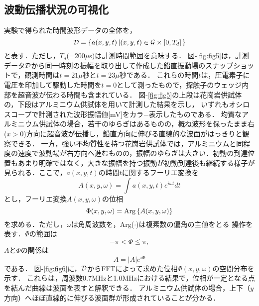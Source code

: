 ﻿%
\subsection{波動伝播状況の可視化}
実験で得られた時間波形データの全体を，
\begin{equation}
	{\cal D}=\left\{
		a(x,y,t)\left| (x,y,t)\in {\cal G}\times [0,T_d] \right.
	\right\}
	\label{eqn:dataset}
\end{equation}
と表す．ただし，$T_d$(=200$\mu$s)は計測時間範囲を意味する．
図-\ref{fig:fig5}は，計測データ$\cal D$から同一時刻の振幅を取り出して作成した鉛直振動場のスナップショットで，観測時間は$t=21\mu$秒と$t=23\mu$秒である．
これらの時間$t$は，圧電素子に電圧を印加して駆動した時間を$t=0$として測ったもので，探触子のウェッジ内部を超音波が伝わる時間も含まれている．
図-\ref{fig:fig5}の上段は花崗岩供試体の，下段はアルミニウム供試体を用いて計測した結果を示し，
いずれもオシロスコープで計測された波形振幅値[mV]をカラ−表示したものである．
均質なアルミニウム供試体の場合，若干のゆらぎはあるものの，概ね波形を保ったまま右($x>0$)方向に超音波が伝播し，鉛直方向に伸びる直線的な波面がはっきりと観察できる．
一方，強い不均質性を持つ花崗岩供試体では，アルミニウムと同程度の速度で波動場が右方向へ進むものの，振幅のゆらぎは大きい．初動の到達位置もあまり明確ではなく，大きな振幅を持つ振動が初動到達後も継続する様子が見られる．ここで，$a(x,y,t)$の時間$t$に関するフーリエ変換を
\begin{equation}
	A(x,y,\omega)=\int a(x,y,t)e^{i\omega t} dt
	\label{eqn:Fourier_t}
\end{equation}
とし，フーリエ変換$A(x,y,\omega)$の位相
\begin{equation}
	\Phi(x,y,\omega)={\rm Arg}\left\{ A(x,y,\omega) \right\}
	\label{eqn:def_Phi}
\end{equation}
を求める．ただし，$\omega$は角周波数を，Arg($\cdot$)は複素数の偏角の主値をとる
操作を表す．$\Phi$の範囲は
\begin{equation}
	-\pi < \Phi \leq \pi, 
	\label{eqn:dom_phi}
\end{equation}
$A$と$\Phi$の関係は
\begin{equation}
	A=\left| A \right|e^{i\Phi}
	\label{eqn:phi2A}
\end{equation}
である．
図-\ref{fig:fig6}に，$\cal D$からFFTによって求めた位相$\Phi(x,y,\omega)$の空間分布を示す．
これらは，周波数0.7MHzと1.0MHzにおける結果で，位相が一定となる点を結んだ曲線は波面を表すと解釈できる．
アルミニウム供試体の場合，上下（$y$方向）へほぼ直線的に伸びる波面群が形成されていることが分かる．
